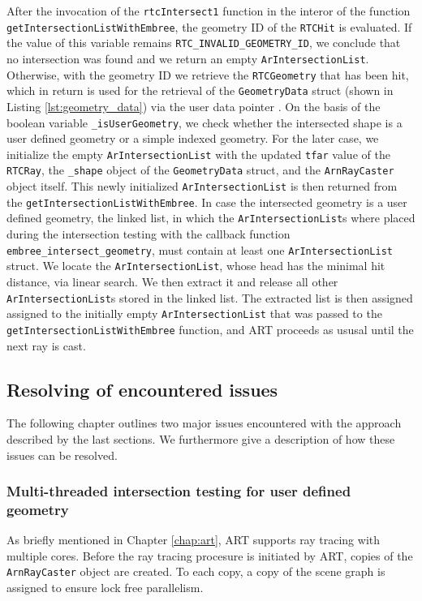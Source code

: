 After the invocation of the \texttt{rtcIntersect1} function in the interor of the function \texttt{getIntersectionListWithEmbree}, the geometry ID of the \texttt{RTCHit} is evaluated. If the value of this variable remains \texttt{RTC\_INVALID\_GEOMETRY\_ID}, we conclude that no intersection was found and we return an empty \texttt{ArIntersectionList}. Otherwise, with the geometry ID we retrieve the \texttt{RTCGeometry} that has been hit, which in return is used for the retrieval of the \texttt{GeometryData} struct (shown in Listing \ref{lst:geometry_data}) via the user data pointer . On the basis of the boolean variable \texttt{\_isUserGeometry}, we check whether the intersected shape is a user defined geometry or a simple indexed geometry. For the later case, we initialize the empty \texttt{ArIntersectionList} with the updated \texttt{tfar} value of the \texttt{RTCRay}, the \texttt{\_shape} object of the \texttt{GeometryData} struct, and the \texttt{ArnRayCaster} object itself. This newly initialized \texttt{ArIntersectionList} is then returned from the \texttt{getIntersectionListWithEmbree}.
In case the intersected geometry is a user defined geometry, the linked list, in which the \texttt{ArIntersectionList}s where placed during the intersection testing with the callback function \texttt{embree\_intersect\_geometry}, must contain at least one \texttt{ArIntersectionList} struct. We locate the \texttt{ArIntersectionList}, whose head has the minimal hit distance, via linear search. We then extract it and release all other \texttt{ArIntersectionList}s stored in the linked list. The extracted list is then assigned assigned to the initially empty \texttt{ArIntersectionList} that was passed to the \texttt{getIntersectionListWithEmbree} function, and ART proceeds as ususal until the next ray is cast.


\subsection{Resolving of encountered issues}
The following chapter outlines two major issues encountered with the approach described by the last sections. We furthermore give a description of how these issues can be resolved.

\subsubsection{Multi-threaded intersection testing for user defined geometry}
As briefly mentioned in Chapter \ref{chap:art}, ART supports ray tracing with multiple cores.
Before the ray tracing procesure is initiated by ART, copies of the \texttt{ArnRayCaster} object are created. To each copy, a copy of the scene graph is assigned to ensure lock free parallelism.

